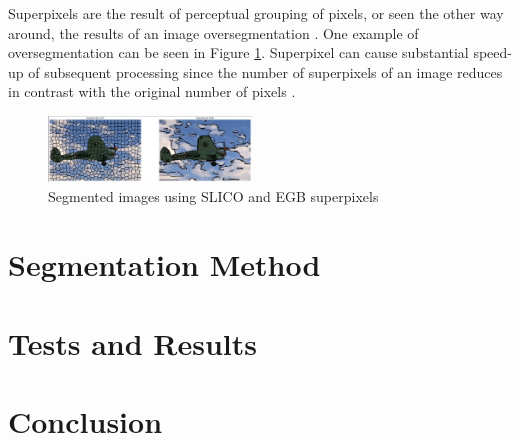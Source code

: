 \documentclass[10pt,twocolumn,letterpaper]{article}
\begin{document}
Superpixels are the result of perceptual grouping of pixels, or seen the other way around, the results of an image oversegmentation \cite{WANG201728}. One example of oversegmentation can be seen in Figure \ref{fig:superpixel}. Superpixel can cause substantial speed-up of subsequent processing since the number of superpixels of an image reduces in contrast with the original number of pixels \cite{WANG201728}.
 
\begin{figure}[ht]
  \centering
  \includegraphics[width=0.48\textwidth]{superpixels.png}
  \caption{Segmented images using SLICO and EGB superpixels}
  \label{fig:superpixel}
\end{figure}

\section{Segmentation Method} \label{sec:mat_metodos}

\section{Tests and Results} \label{sec:testes}

\section{Conclusion} \label{sec:conclusao}


{\small


}
\end{document}
